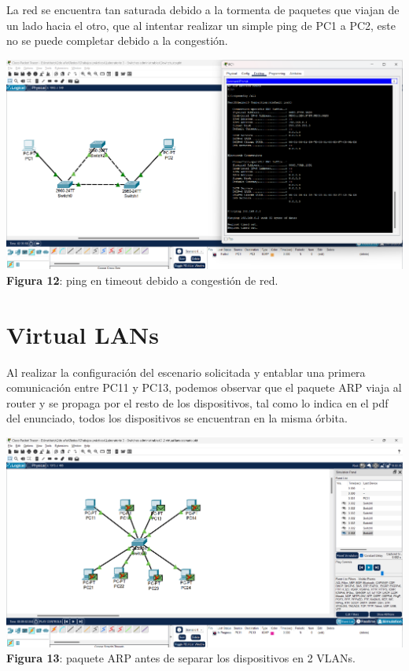 \documentclass{article}
\begin{document}
    La red se encuentra tan saturada debido a la tormenta de paquetes que viajan de un lado hacia el otro, que al intentar realizar un simple ping de PC1 a PC2, este no se puede completar debido a la congestión.

    \begin{center}
        \includegraphics[width=0.875\linewidth]{img_15} 
        \linebreak
        \small {\bfseries Figura 12}: ping en timeout debido a congestión de red.
    \end{center}

    \pagebreak

    \section{Virtual LANs}
    Al realizar la configuración del escenario solicitada y entablar una primera comunicación entre PC11 y PC13, podemos observar que el paquete ARP viaja al router y se propaga por el resto de los dispositivos, tal como lo indica en el pdf del enunciado, todos los dispositivos se encuentran en la misma órbita.

    \begin{center}
        \includegraphics[width=0.775\linewidth]{img_17}  
        \linebreak
        \small {\bfseries Figura 13}: paquete ARP antes de separar los dispositivos en 2 VLANs.
    \end{center}
\end{document}
